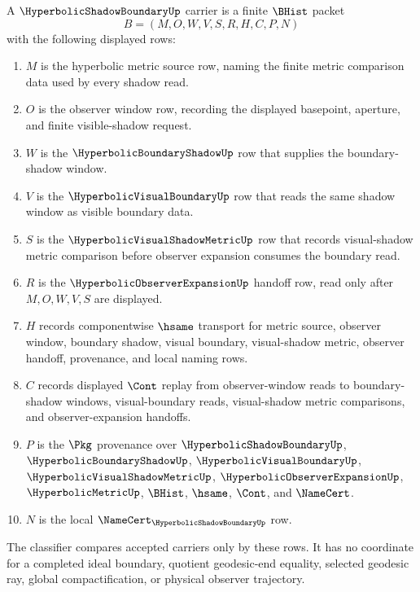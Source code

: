 \begin{definition}
\label{def:hyperbolic-shadow-boundary-carrier}
A $\HyperbolicShadowBoundaryUp$ carrier is a finite $\BHist$ packet
$$
B=(M,O,W,V,S,R,H,C,P,N)
$$
with the following displayed rows:
\begin{enumerate}
\item $M$ is the hyperbolic metric source row, naming the finite metric comparison data used by every shadow read.
\item $O$ is the observer window row, recording the displayed basepoint, aperture, and finite visible-shadow request.
\item $W$ is the $\HyperbolicBoundaryShadowUp$ row that supplies the boundary-shadow window.
\item $V$ is the $\HyperbolicVisualBoundaryUp$ row that reads the same shadow window as visible boundary data.
\item $S$ is the $\HyperbolicVisualShadowMetricUp$ row that records visual-shadow metric comparison before observer expansion consumes the boundary read.
\item $R$ is the $\HyperbolicObserverExpansionUp$ handoff row, read only after $M,O,W,V,S$ are displayed.
\item $H$ records componentwise $\hsame$ transport for metric source, observer window, boundary shadow, visual boundary, visual-shadow metric, observer handoff, provenance, and local naming rows.
\item $C$ records displayed $\Cont$ replay from observer-window reads to boundary-shadow windows, visual-boundary reads, visual-shadow metric comparisons, and observer-expansion handoffs.
\item $P$ is the $\Pkg$ provenance over $\HyperbolicShadowBoundaryUp$, $\HyperbolicBoundaryShadowUp$, $\HyperbolicVisualBoundaryUp$, $\HyperbolicVisualShadowMetricUp$, $\HyperbolicObserverExpansionUp$, $\HyperbolicMetricUp$, $\BHist$, $\hsame$, $\Cont$, and $\NameCert$.
\item $N$ is the local $\NameCert_{\HyperbolicShadowBoundaryUp}$ row.
\end{enumerate}
The classifier compares accepted carriers only by these rows. It has no coordinate for a completed ideal boundary, quotient geodesic-end equality, selected geodesic ray, global compactification, or physical observer trajectory.
\end{definition}

